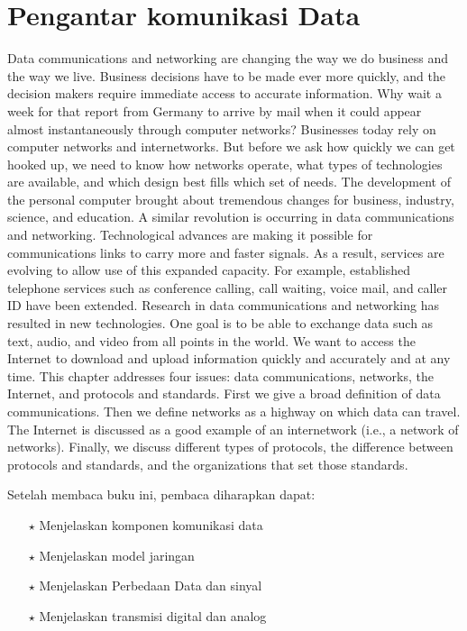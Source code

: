 \chapter{Pengantar komunikasi Data}
Data communications and networking are changing the way we do business and the way we live. Business decisions have to be made ever more quickly, and the decision makers require immediate access to accurate information. Why wait a week for that report from Germany to arrive by mail when it could appear almost instantaneously through computer networks? Businesses today rely on computer networks and internetworks. But before we ask how quickly we can get hooked up, we need to know how networks operate, what types of technologies are available, and which design best fills which set of needs. The development of the personal computer brought about tremendous changes for business, industry, science, and education. A similar revolution is occurring in data communications and networking. Technological advances are making it possible for communications links to carry more and faster signals. As a result, services are evolving to allow use of this expanded capacity. For example, established telephone services such as conference calling, call waiting, voice mail, and caller ID have been extended. Research in data communications and networking has resulted in new technologies. One goal is to be able to exchange data such as text, audio, and video from all points in the world. We want to access the Internet to download and upload information quickly and accurately and at any time. This chapter addresses four issues: data communications, networks, the Internet, and protocols and standards. First we give a broad definition of data communications. Then we define networks as a highway on which data can travel. The Internet is discussed as a good example of an internetwork (i.e., a network of networks). Finally, we discuss different types of protocols, the difference between protocols and standards, and the organizations that set those standards.

Setelah membaca buku ini, pembaca diharapkan dapat:
\begin{itemize}
  \item[$\star$] Menjelaskan komponen komunikasi data 
  \item[$\star$] Menjelaskan model jaringan
  \item[$\star$] Menjelaskan Perbedaan Data dan sinyal
  \item[$\star$] Menjelaskan transmisi digital dan analog
\end{itemize}

